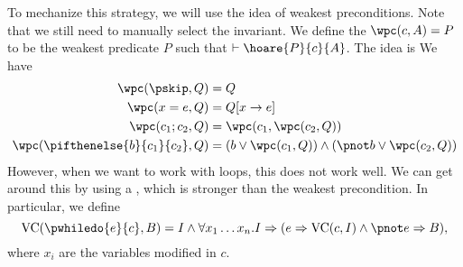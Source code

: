\documentclass[class=scrartcl]{standalone}
\begin{document}
To mechanize this strategy, we will use the idea of weakest preconditions.
Note that we still need to manually select the invariant.
We define the  \(\wpc(c, A) = P\)
to be the weakest predicate \(P\) such that \(\vdash \hoare{P}{c}{A}\).
The idea is \TODO[]
We have
\begin{align*}
  \wpc(\pskip, Q) &= Q \\
  \wpc(x = e, Q) &= Q[x \to e] \\
  \wpc(c_1; c_2, Q) &= \wpc(c_1, \wpc(c_2, Q)) \\
  \wpc(\pifthenelse{b}{c_1}{c_2}, Q)
    &= (b \lor \wpc(c_1, Q))
       \land (\pnot b \lor \wpc(c_2, Q))
\end{align*}
However, when we want to work with loops, this does not work well.
We can get around this by using a ,
which is stronger than the weakest precondition.
In particular, we define
\[
  \operatorname{VC}(\pwhiledo{e}{c}, B)
    = I \land \forall x_1 \dots x_n. I
        \Rightarrow (e \Rightarrow \operatorname{VC}(c, I)
                       \land \pnot e \Rightarrow B),
\]
where \(x_i\) are the variables modified in \(c\).
\end{document}
